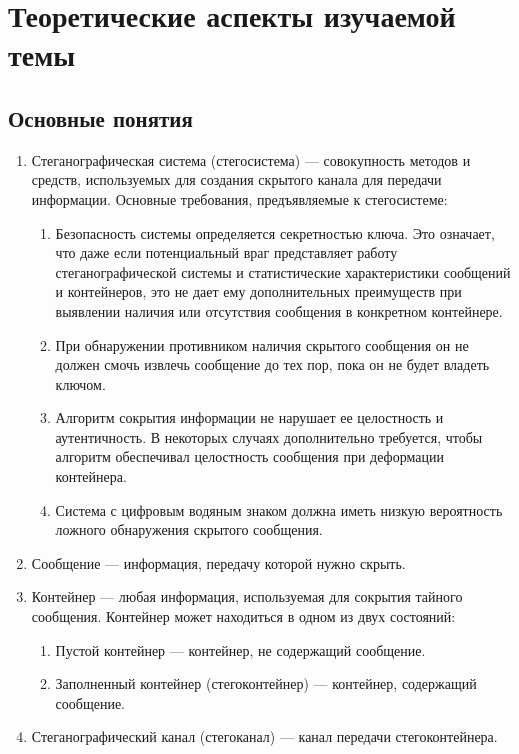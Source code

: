 \chapter{Теоретические аспекты изучаемой темы}

\section{Основные понятия}

\begin{enumerate}
    \item Стеганографическая система (стегосистема) --- совокупность методов и средств,
    используемых для создания скрытого канала для передачи информации.
    Основные требования, предъявляемые к стегосистеме:
    \begin{enumerate}
        \item Безопасность системы определяется секретностью ключа.
        Это означает, что даже если потенциальный враг представляет работу стеганографической системы
        и статистические характеристики сообщений и контейнеров,
        это не дает ему дополнительных преимуществ при выявлении
        наличия или отсутствия сообщения в конкретном контейнере.
        \item При обнаружении противником наличия скрытого сообщения
        он не должен смочь извлечь сообщение до тех пор, пока он не будет владеть ключом.
        \item Алгоритм сокрытия информации не нарушает ее целостность и аутентичность.
        В некоторых случаях дополнительно требуется,
        чтобы алгоритм обеспечивал целостность сообщения при деформации контейнера.
        \item Система с цифровым водяным знаком должна иметь низкую вероятность ложного обнаружения скрытого сообщения.
    \end{enumerate}
    \item Сообщение --- информация, передачу которой нужно скрыть.
    \item Контейнер --- любая информация,
    используемая для сокрытия тайного сообщения. Контейнер может находиться в одном из двух состояний:
    \begin{enumerate}
        \item Пустой контейнер --- контейнер, не содержащий сообщение.
        \item Заполненный контейнер (стегоконтейнер) --- контейнер, содержащий сообщение.
    \end{enumerate}
    \item Стеганографический канал (стегоканал) --- канал передачи стегоконтейнера.

\end{enumerate}
